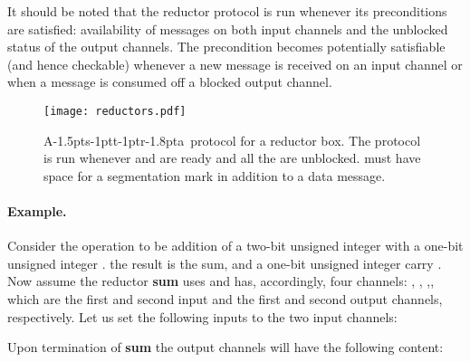 \documentclass[11pt]{report}
\def\ak{{\textsf{A\kern-1.5pts\kern-1ptt\kern-1ptr\kern-1.8pta}}\kern-2pt{\it K\kern-2ptahn}}
\begin{document}
It should be noted that the reductor protocol is run whenever its preconditions are satisfied: availability of messages on both input channels and the unblocked status of the output channels. The precondition becomes potentially satisfiable (and hence checkable) whenever a new message is received on an input channel or when a message is consumed off a blocked output channel.


\begin{figure}
\texttt{[image: reductors.pdf]}\\
\vspace{-1in}
\caption{\ak\ protocol for a reductor box. The protocol is run whenever  and  are ready and
all the  are unblocked.  must have space for a segmentation mark in addition to a data message.
\label{fig:reductors}}
\end{figure}


\paragraph{Example.}

Consider the operation  to be addition of a two-bit unsigned integer  with a one-bit unsigned integer . the result is the sum,  and a one-bit unsigned integer carry . Now assume the reductor {\bf sum} uses  and has, accordingly, four channels: , , ,, which are the first and second input and the first and second output channels, respectively. Let us set the following inputs to the two input channels:

Upon termination of {\bf sum} the output channels will have the following content:
\end{document}
